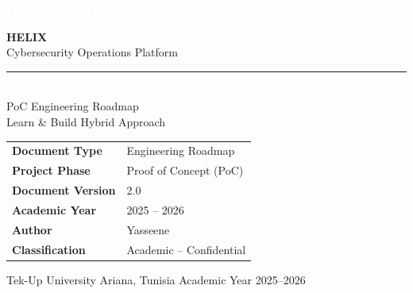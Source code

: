 \documentclass[11pt,a4paper]{report}
\begin{document}

\begin{titlepage}
    \thispagestyle{empty}
    \noindent\colorbox{helixpurple}{%
        \parbox{\dimexpr\textwidth+2\fboxsep\relax}{%
            \vspace{8pt}
            \hspace{8pt}\textcolor{white}{\small\scshape{Proof of Concept Engineering Roadmap}}
            \vspace{8pt}
        }%
    }
    \vspace{3cm}
    \begin{center}
        {\fontsize{52}{60}\selectfont\bfseries\color{helixpurple} HELIX}\\[10pt]
        {\Large\color{textsecondary}Cybersecurity Operations Platform}\\[8pt]
        \color{helixborder}\rule{0.65\textwidth}{0.5pt}\\[30pt]
        {\large\color{textsecondary}PoC Engineering Roadmap}\\[6pt]
        {\normalsize\color{textsecondary}Learn \& Build Hybrid Approach}
    \end{center}
    \vfill
    \begin{center}
        \begin{tabular}{L{5.2cm} L{7.5cm}}
            \toprule
            \textbf{Document Type}    & Engineering Roadmap \\
            \textbf{Project Phase}    & Proof of Concept (PoC) \\
            \textbf{Document Version} & 2.0 \\
            \textbf{Academic Year}    & 2025 -- 2026 \\
            \textbf{Author}           & Yasseene \\
            \textbf{Classification}   & Academic -- Confidential \\
            \bottomrule
        \end{tabular}
    \end{center}
    \vspace{1.5cm}
    \noindent\colorbox{helixgraylight}{%
        \parbox{\dimexpr\textwidth+2\fboxsep\relax}{%
            \vspace{8pt}
            \hspace{8pt}\small\color{textsecondary}
            Tek-Up University \hfill Ariana, Tunisia \hfill Academic Year 2025--2026
            \vspace{8pt}
        }%
    }
\end{titlepage}
\end{document}
